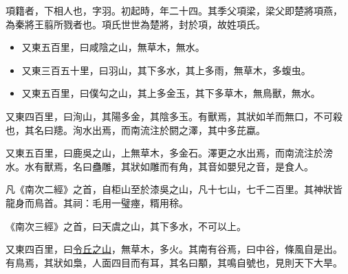 \documentclass[10pt]{article} %
\begin{document}
\begin{minipage}[t]{.66\linewidth}

\hypertarget{secondnews}{} %

項籍者，下相人也，字羽。初起時，年二十四。其季父項梁，梁父即楚將項燕，
為秦將王翦所戮者也。項氏世世為楚將，封於項，故姓項氏。

\begin{itemize}
\item 又東五百里，曰咸陰之山，無草木，無水。
\item 又東三百五十里，曰羽山，其下多水，其上多雨，無草木，多蝮虫。
\item 又東五百里，曰僕勾之山，其上多金玉，其下多草木，無鳥獸，無水。
\end{itemize}

又東四百里，曰洵山，其陽多金，其陰多玉。有獸焉，其狀如羊而無口，不可殺
也，其名曰䍺。洵水出焉，而南流注於閼之澤，其中多芘蠃。

又東五百里，曰鹿吳之山，上無草木，多金石。澤更之水出焉，而南流注於滂
水。水有獸焉，名曰蠱雕，其狀如雕而有角，其音如嬰兒之音，是食人。

凡《南次二經》之首，自柜山至於漆吳之山，凡十七山，七千二百里。其神狀皆
龍身而鳥首。其祠：毛用一璧瘞，糈用稌。

《南次三經》之首，曰天虞之山，其下多水，不可以上。

又東四百里，曰\href{http://www.example.com/}{令丘之山}，無草木，多火。其南有谷焉，曰中谷，條風自是出。
有鳥焉，其狀如梟，人面四目而有耳，其名曰顒，其鳴自號也，見則天下大旱。

\end{minipage} %

\end{document}
